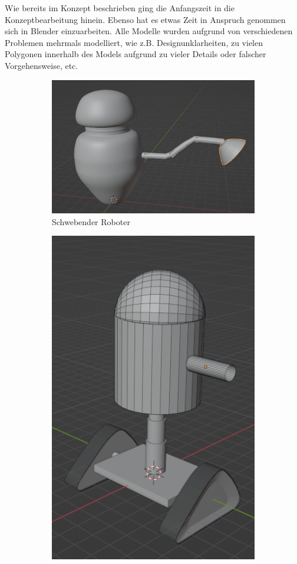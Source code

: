 Wie bereits im Konzept beschrieben ging die Anfangszeit in die Konzeptbearbeitung hinein. Ebenso hat es etwas Zeit in Anspruch genommen sich in Blender einzuarbeiten. Alle Modelle wurden aufgrund von verschiedenen Problemen mehrmals modelliert, wie z.B. Designunklarheiten, zu vielen Polygonen innerhalb des Models aufgrund zu vieler Details oder falscher Vorgehensweise, etc. 
\begin{figure}[H]
	\begin{subfigure}{0.5\textwidth}
		\centering
		\includegraphics[height=0.3\pageheight,keepaspectratio]{pics/6} 
		\caption{Schwebender Roboter}
	\end{subfigure}	
	\begin{subfigure}{0.5\textwidth}
		\centering
		\includegraphics[height=0.3\pageheight,keepaspectratio]{pics/7} 

\end{subfigure}
\end{figure}
